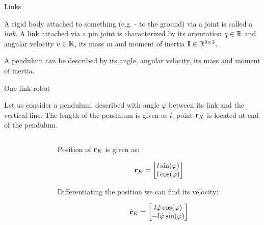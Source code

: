 \documentclass{beamer}
\begin{document}
\begin{frame}{Links}
	\begin{flushleft}
		
		
		A rigid body attached to something (e.g. - to the ground) via a joint is called a \emph{link}. A link attached via a pin joint is characterized by its orientation $q \in \mathbb{R}$ and angular velocity $v \in \mathbb{R}$, its mass $m$ and moment of inertia $\mathbf{I} \in \mathbb{R}^{3 \times 3}$.
		
		\bigskip
		
		\begin{example}
			A pendulum can be described by its angle, angular velocity, its mass and moment of inertia.
		\end{example}
		
	\end{flushleft}
\end{frame}



\begin{frame}{One link robot}
	\begin{flushleft}
		
		Let us consider a pendulum, described with angle $\varphi$ between its link and the vertical line. The length of the pendulum is given as $l$, point $\mathbf{r}_K$ is located at end of the pendulum.
		
		\bigskip
		
		\begin{columns}
			\begin{column}{0.5\textwidth}
				
			\end{column}
			\begin{column}{0.5\textwidth}  %
				
				Position of $\mathbf{r}_K$ is given as:
				
				\begin{equation}
					\mathbf{r}_K = \begin{bmatrix}
						l \sin (\varphi) \\ 
						l \cos (\varphi) 
					\end{bmatrix}
				\end{equation}
				
				Differentiating the position we can find its velocity:
				
				\begin{equation}
					\dot{\mathbf{r}}_K = \begin{bmatrix}
						l \dot \varphi \cos (\varphi) \\ 
						-l \dot \varphi \sin (\varphi) 
					\end{bmatrix}
				\end{equation}
				
				
			\end{column}
		\end{columns}
		
		
	\end{flushleft}
\end{frame}
\end{document}
